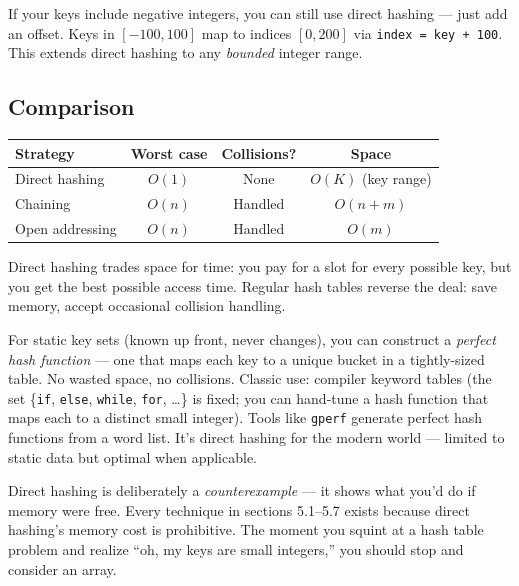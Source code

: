\documentclass[11pt]{article}
\begin{document}
\begin{warnbox}
If your keys include negative integers, you can still use direct
hashing --- just add an offset. Keys in $[-100, 100]$ map to
indices $[0, 200]$ via \texttt{index = key + 100}. This extends
direct hashing to any \emph{bounded} integer range.
\end{warnbox}

\subsection*{Comparison}

\begin{center}
\begin{tabular}{|l|c|c|c|}
\hline
\textbf{Strategy} & \textbf{Worst case} & \textbf{Collisions?} & \textbf{Space} \\
\hline
Direct hashing    & $O(1)$ & None       & $O(K)$ (key range) \\
Chaining          & $O(n)$ & Handled    & $O(n + m)$ \\
Open addressing   & $O(n)$ & Handled    & $O(m)$ \\
\hline
\end{tabular}
\end{center}

Direct hashing trades space for time: you pay for a slot for
every possible key, but you get the best possible access time.
Regular hash tables reverse the deal: save memory, accept
occasional collision handling.

\begin{notebox}
For static key sets (known up front, never changes), you can
construct a \emph{perfect hash function} --- one that maps each
key to a unique bucket in a tightly-sized table. No wasted space,
no collisions. Classic use: compiler keyword tables (the set
\{\texttt{if}, \texttt{else}, \texttt{while}, \texttt{for},
\ldots\} is fixed; you can hand-tune a hash function that maps
each to a distinct small integer). Tools like \texttt{gperf}
generate perfect hash functions from a word list. It's direct
hashing for the modern world --- limited to static data but
optimal when applicable.
\end{notebox}

\begin{ideabox}
Direct hashing is deliberately a \emph{counterexample} --- it
shows what you'd do if memory were free. Every technique in
sections 5.1--5.7 exists because direct hashing's memory cost is
prohibitive. The moment you squint at a hash table problem and
realize ``oh, my keys are small integers,'' you should stop and
consider an array.
\end{ideabox}
\end{document}
